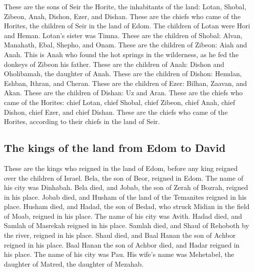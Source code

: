 \begin{paracol}{2}
\begin{otherlanguage}{english}
 These are the sons of Seir the Horite, the inhabitants
of the land: Lotan, Shobal, Zibeon, Anah,  Dishon, Ezer,
and Dishan. These are the chiefs who came of the Horites, the children
of Seir in the land of Edom.  The children of Lotan were
Hori and Heman. Lotan's sister was Timna.  These are the
children of Shobal: Alvan, Manahath, Ebal, Shepho, and Onam.
 These are the children of Zibeon: Aiah and Anah. This is
Anah who found the hot springs in the wilderness, as he fed the donkeys
of Zibeon his father.  These are the children of Anah:
Dishon and Oholibamah, the daughter of Anah.  These are
the children of Dishon: Hemdan, Eshban, Ithran, and Cheran.
 These are the children of Ezer: Bilhan, Zaavan, and
Akan.  These are the children of Dishan: Uz and Aran.
 These are the chiefs who came of the Horites: chief
Lotan, chief Shobal, chief Zibeon, chief Anah,  chief
Dishon, chief Ezer, and chief Dishan. These are the chiefs who came of
the Horites, according to their chiefs in the land of Seir.

\hypertarget{the-kings-of-the-land-from-edom-to-david}{%
\subsection{The kings of the land from Edom to
David}\label{the-kings-of-the-land-from-edom-to-david}}

 These are the kings who reigned in the land of Edom,
before any king reigned over the children of Israel. 
Bela, the son of Beor, reigned in Edom. The name of his city was
Dinhabah.  Bela died, and Jobab, the son of Zerah of
Bozrah, reigned in his place.  Jobab died, and Husham of
the land of the Temanites reigned in his place.  Husham
died, and Hadad, the son of Bedad, who struck Midian in the field of
Moab, reigned in his place. The name of his city was Avith.
 Hadad died, and Samlah of Masrekah reigned in his place.
 Samlah died, and Shaul of Rehoboth by the river, reigned
in his place.  Shaul died, and Baal Hanan the son of
Achbor reigned in his place.  Baal Hanan the son of
Achbor died, and Hadar reigned in his place. The name of his city was
Pau. His wife's name was Mehetabel, the daughter of Matred, the daughter
of Mezahab.

\hypertarget{the-dukes-of-edom-for-their-places}{%
}
\end{otherlanguage}
\end{paracol}
